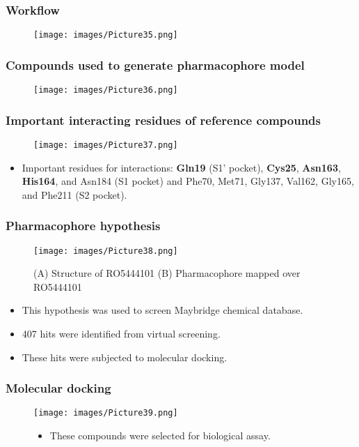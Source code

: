 \documentclass{beamer}
\begin{document}
\begin{frame}
\frametitle{\textbf{Workflow}}
\begin{figure}
\texttt{[image: images/Picture35.png]}
\end{figure}
\end{frame}

\begin{frame}
\frametitle{\textbf{Compounds used to generate pharmacophore model}}
\begin{figure}
\texttt{[image: images/Picture36.png]}
\end{figure}
\end{frame}

\begin{frame}
\frametitle{\textbf{Important interacting residues of reference compounds}}
\begin{figure}
\texttt{[image: images/Picture37.png]}
\end{figure}
\begin{itemize}
\item Important residues for interactions: \textbf{Gln19} (S1’ pocket), \textbf{Cys25}, \textbf{Asn163}, \textbf{His164}, and Asn184 (S1 pocket) and Phe70, Met71, Gly137, Val162, Gly165, and Phe211 (S2 pocket).
\end{itemize}
\end{frame}

\begin{frame}
\frametitle{\textbf{Pharmacophore hypothesis}}
\begin{figure}
\texttt{[image: images/Picture38.png]}
\caption{(A) Structure of RO5444101 (B) Pharmacophore mapped over RO5444101}
\end{figure}
\begin{itemize}
\item This hypothesis was used to screen Maybridge chemical database.
\item 407 hits were identified from virtual screening.
\item These hits were subjected to molecular docking.
\end{itemize}
\end{frame}

\begin{frame}
\frametitle{\textbf{Molecular docking}}
\begin{figure}
\texttt{[image: images/Picture39.png]}
\begin{itemize}
\item These compounds were selected for biological assay.
\end{itemize}
\end{figure}
\end{frame}
\end{document}
